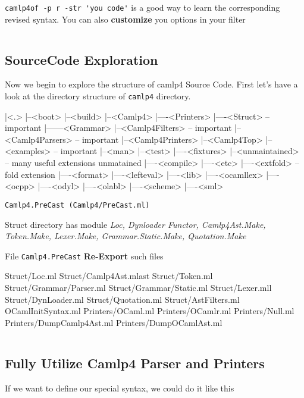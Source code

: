 \verb|camlp4of -p r -str 'you code'| is a good way to learn the
corresponding revised syntax.  You can also \textbf{customize} you
options in your filter 

\inputminted[fontsize=\scriptsize,
  firstline=19,lastline=26]{ocaml}{camlp4/examples/pa_abstract.ml}

\subsection{SourceCode Exploration}
Now we begin to explore the structure of camlp4 Source Code.  First
let's have a look at the directory structure of \verb|camlp4|
directory.


\begin{bluetext}
|<.>
|--<boot>
|--<build>
|--<Camlp4>
|----<Printers>
|----<Struct>       -- important
|------<Grammar> 
|--<Camlp4Filters>  -- important 
|--<Camlp4Parsers>  -- important 
|--<Camlp4Printers> 
|--<Camlp4Top>
|--<examples>       -- important
|--<man>
|--<test>
|----<fixtures>
|--<unmaintained>   -- many useful extensions unmatained
|----<compile>
|----<etc>
|----<extfold>      -- fold extension 
|----<format>
|----<lefteval>
|----<lib>
|----<ocamllex>
|----<ocpp>
|----<odyl>
|----<olabl>
|----<scheme>
|----<sml>
\end{bluetext}



\verb|Camlp4.PreCast (Camlp4/PreCast.ml)|

Struct directory has module \textit{Loc, Dynloader Functor,
  Camlp4Ast.Make, Token.Make, Lexer.Make, Grammar.Static.Make,
  Quotation.Make}

File \verb|Camlp4.PreCast| \textbf{Re-Export} such files

    \begin{bluetext}
    Struct/Loc.ml 
    Struct/Camlp4Ast.mlast 
    Struct/Token.ml 
    Struct/Grammar/Parser.ml 
    Struct/Grammar/Static.ml 
    Struct/Lexer.mll 
    Struct/DynLoader.ml 
    Struct/Quotation.ml 
    Struct/AstFilters.ml 
    OCamlInitSyntax.ml 
    Printers/OCaml.ml 
    Printers/OCamlr.ml
    Printers/Null.ml 
    Printers/DumpCamlp4Ast.ml
    Printers/DumpOCamlAst.ml 
    \end{bluetext}


\inputminted[fontsize=\scriptsize, 
             lastline=55]{ocaml}{camlp4/code/PreCast_OCamlInitSyntax.ml}

\subsection{Fully Utilize Camlp4 Parser and Printers}
If we want to define our special syntax, we could do it like this 
\inputminted[fontsize=\scriptsize,]{ocaml}{camlp4/code/my_own_syntax.ml}


